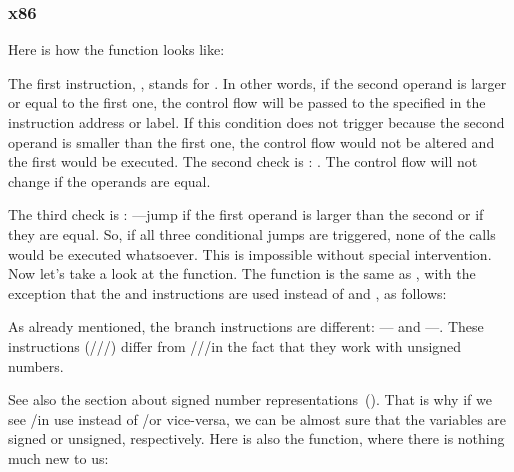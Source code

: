 \subsubsection{x86}


Here is how the  function looks like:




The first instruction, \JLE, stands for . 
In other words, if the second operand is 
larger or equal to the first one, the control flow will be passed to the specified in the instruction address or label.
If this condition does not trigger because the second operand is smaller than the first one, the control flow would not be altered and the first \printf would be executed.
The second check is \JNE: .
The control flow will not change if the operands are equal.

The third check is \JGE: ---jump if the first operand is larger than 
the second or if they are equal.
So, if all three conditional jumps are triggered, none of the \printf calls would be executed whatsoever. 
This is impossible without special intervention.
Now let's take a look at the  function.
The  function is the same as , with the exception that the \JBE and \JAE instructions
are used instead of \JLE and \JGE, as follows:




As already mentioned, the branch instructions are different:
\JBE--- and \JAE---.
These instructions (\JA/\JAE/\JB/\JBE) differ from \JG/\JGE/\JL/\JLE in the fact that they work with unsigned numbers.


See also the section about signed number representations~().
That is why if we see \JG/\JL in use instead of \JA/\JB or vice-versa, 
we can be almost sure that the variables are signed or unsigned, respectively.
Here is also the \main function, where there is nothing much new to us:

